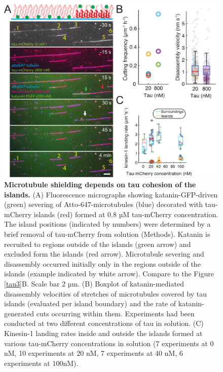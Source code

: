 \begin{figure}[h!]
\centering
\includegraphics[scale=0.8]{Figures/tau6.png}
\caption[Microtubule shielding depends on tau cohesion of the islands.]{ 
\textbf{Microtubule shielding depends on tau cohesion of the islands.} (A) Fluorescence micrographs showing katanin-GFP-driven (green) severing of Atto-647-microtubules (blue) decorated with tau-mCherry islands (red) formed at 0.8 µM tau-mCherry concentration. The island positions (indicated by numbers) were determined by a brief removal of tau-mCherry from solution (Methods). Katanin is recruited to regions outside of the islands (green arrow) and excluded form the islands (red arrow). Microtubule severing and disassembly occurred initially only in the regions outside of the islands (example indicated by white arrow). Compare to the Figure \ref{tau3}B. Scale bar 2 µm. (B) Boxplot of katanin-mediated disassembly velocities of stretches of microtubules covered by tau islands (evaluated per island boundary) and the rate of katanin-generated cuts occurring within them. Experiments had been conducted at two different concentrations of tau in solution. (C) Kinesin-1 landing rates inside and outside the islands formed at various tau-mCherry concentrations in solution (7 experiments at 0 nM, 10 experiments at 20 nM, 7 experiments at 40 nM, 6 experiments at 100nM).
	}\label{tau6}
\end{figure}
